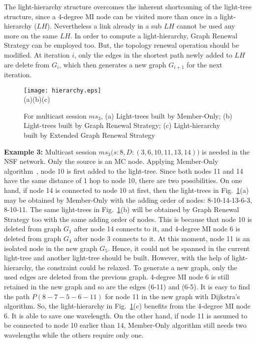 \documentclass[conference]{IEEEtran}
\begin{document}
The light-hierarchy structure overcomes the inherent shortcoming of the light-tree structure, since a 4-degree MI node can be visited more than once in a light-hierarchy ($LH$). Nevertheless a link already in a sub $LH$ cannot be used any more on the same $LH$. In order to compute a light-hierarchy, Graph Renewal Strategy can be employed too. But, the topology renewal operation should be modified. At iteration $i$, only the edges in the shortest path newly added to $LH$ are delete from $G_{i}$, which then generates a new graph $G_{i+1}$ for the next iteration.

\begin{figure}
        \centering
        \texttt{[image: hierarchy.eps]}
        \\
        \mbox{(a)}\hspace{.9in}\mbox{(b)}\hspace{.9in}\mbox{(c)}
        \caption{For multicast session $ms_{3}$, (a) Light-trees built by Member-Only; (b) Light-trees built by Graph Renewal Strategy; (c) Light-hierarchy built by Extended Graph Renewal Strategy}
        \label{fig: hierarchy}
\end{figure}

\textbf{Example 3:} Multicast session $ms_{3}\big(s:8,D:(3, 6, 10, 11, 13, 14)\big)$ is needed in the NSF network. Only the source is an MC node. Applying Member-Only algorithm~\cite{xjzhang2000}, node 10 is first added to the light-tree. Since both nodes 11 and 14 have the same distance of 1 hop to node 10, there are two possibilities. On one hand, if node 14 is connected to node 10 at first, then the light-trees in Fig.~\ref{fig: hierarchy}(a) may be obtained by Member-Only with the adding order of nodes: 8-10-14-13-6-3, 8-10-11. The same light-trees in Fig.~\ref{fig: hierarchy}(b) will be obtained by Graph Renewal Strategy too with the same adding order of nodes. This is because that node 10 is deleted from graph $G_{1}$ after node 14 connects to it, and 4-degree MI node 6 is deleted from graph $G_{4}$ after node 3 connects to it. At this moment, node 11 is an isolated node in the new graph $G_{5}$. Hence, it could not be spanned in the current light-tree and another light-tree should be built. However, with the help of light-hierarchy, the constraint could be relaxed. To generate a new graph, only the used edges are deleted from the previous graph. 4-degree MI node 6 is still retained in the new graph and so are the edges (6-11) and (6-5). It is easy to find the path $P(8-7-5-6-11)$ for node 11 in the new graph with Dijkstra's algorithm. So, the light-hierarchy in Fig.~\ref{fig: hierarchy}(c) benefits from the 4-degree MI node 6. It is able to save one wavelength. On the other hand, if node 11 is assumed to be connected to node 10 earlier than 14, Member-Only algorithm still needs two wavelengths while the others require only one.
\end{document}
